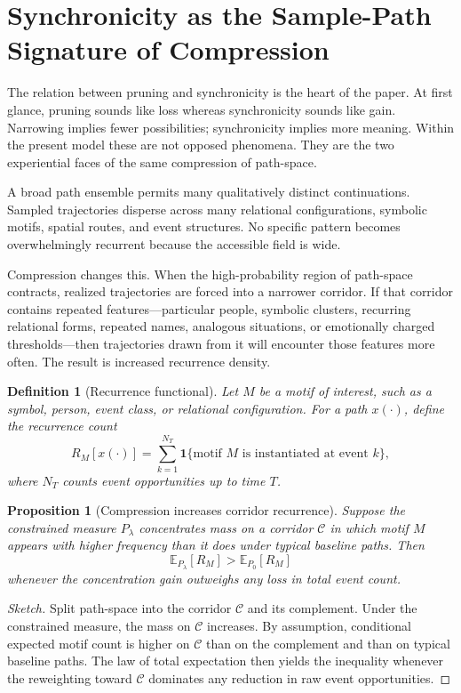 \documentclass[12pt]{article}
\newtheorem{definition}{Definition}
\newtheorem{proposition}{Proposition}
\begin{document}
\section{Synchronicity as the Sample-Path Signature of Compression}

The relation between pruning and synchronicity is the heart of the paper. At first glance, pruning sounds like loss whereas synchronicity sounds like gain. Narrowing implies fewer possibilities; synchronicity implies more meaning. Within the present model these are not opposed phenomena. They are the two experiential faces of the same compression of path-space.

A broad path ensemble permits many qualitatively distinct continuations. Sampled trajectories disperse across many relational configurations, symbolic motifs, spatial routes, and event structures. No specific pattern becomes overwhelmingly recurrent because the accessible field is wide.

Compression changes this. When the high-probability region of path-space contracts, realized trajectories are forced into a narrower corridor. If that corridor contains repeated features---particular people, symbolic clusters, recurring relational forms, repeated names, analogous situations, or emotionally charged thresholds---then trajectories drawn from it will encounter those features more often. The result is increased recurrence density.

\begin{definition}[Recurrence functional]
Let $M$ be a motif of interest, such as a symbol, person, event class, or relational configuration. For a path $x(\cdot)$, define the recurrence count
\[
R_M[x(\cdot)] = \sum_{k=1}^{N_T} \mathbf{1}\{\text{motif } M \text{ is instantiated at event } k\},
\]
where $N_T$ counts event opportunities up to time $T$.
\end{definition}

\begin{proposition}[Compression increases corridor recurrence]
Suppose the constrained measure $P_\lambda$ concentrates mass on a corridor $\mathcal{C}$ in which motif $M$ appears with higher frequency than it does under typical baseline paths. Then
\[
\mathbb{E}_{P_\lambda}[R_M] > \mathbb{E}_{P_0}[R_M]
\]
whenever the concentration gain outweighs any loss in total event count.
\end{proposition}

\begin{proof}[Sketch]
Split path-space into the corridor $\mathcal{C}$ and its complement. Under the constrained measure, the mass on $\mathcal{C}$ increases. By assumption, conditional expected motif count is higher on $\mathcal{C}$ than on the complement and than on typical baseline paths. The law of total expectation then yields the inequality whenever the reweighting toward $\mathcal{C}$ dominates any reduction in raw event opportunities.
\end{proof}
\end{document}
